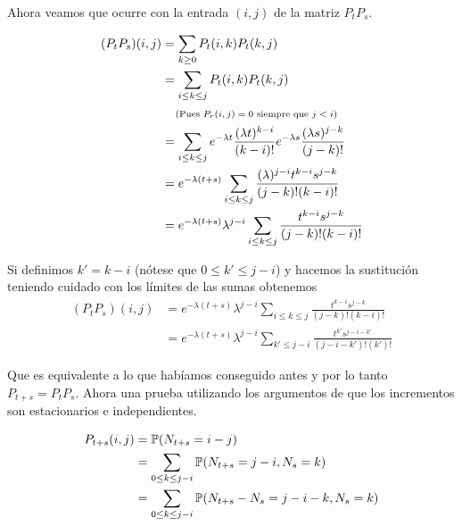 Ahora veamos que ocurre con la entrada $(i,j)$ de la matriz $P_t P_s$.

\begin{align}
    (P_t P_s)(i,j)      &=  \sum_{k \geq 0}         P_t(i,k) P_t(k,j)                                                                                       \\
                        &=  \sum_{i \leq k \leq j}  P_t(i,k) P_t(k,j)                                                                                       \\
                        &\comment{Pues $P_r(i,j) = 0$ siempre que $j < i$}                                                                                  \\
                        &= \sum_{i \leq k \leq j}  e^{-\lambda t} \frac{(\lambda t)^{k- i}}{(k - i)!} e^{-\lambda s} \frac{(\lambda s)^{j - k}}{(j - k)!}   \\
                        &= e^{-\lambda (t+s)}\sum_{i \leq k \leq j}   \frac{(\lambda)^{j - i} t^{k-i} s^{j-k}}{(j - k)!(k - i)!}                            \\
                        &= e^{-\lambda (t+s)} \lambda^{j - i} \sum_{i \leq k \leq j}   \frac{ t^{k-i} s^{j-k}}{(j - k)!(k - i)!}
\end{align}

Si definimos $k' = k - i$ (nótese que $0 \leq k' \leq j - i$) y hacemos la sustitución teniendo cuidado con los límites de las sumas obtenemos
\begin{align}
    (P_t P_s)(i,j)      &=  e^{-\lambda (t+s)} \lambda^{j - i} \sum_{i \leq k \leq j}   \frac{ t^{k-i} s^{j-k}}{(j - k)!(k - i)!}                           \\
                        &=  e^{-\lambda (t+s)} \lambda^{j - i} \sum_{k' \leq j - i}   \frac{ t^{k'} s^{j - i -k'}}{(j - i - k')!(k')!}                        
\end{align}\pn

Que es equivalente a lo que habíamos conseguido antes y por lo tanto $P_{t+s} = P_t P_s$.
Ahora una prueba utilizando los argumentos de que los incrementos son estacionarios e independientes.

\begin{align}
    P_{t+s}(i,j)    &=  \P(N_{t+s} = i-j)                                              \\
                    &=  \sum_{0 \leq k\leq j-i}\P(N_{t+s} = j-i, N_s = k)              \\
                    &=  \sum_{0 \leq k\leq j-i}\P(N_{t+s} - N_s = j-i-k, N_s = k)      \\
\end{align}

